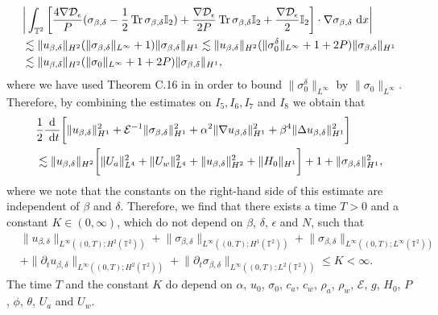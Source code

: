 \documentclass[12pt,a4paper]{article}
\theoremstyle{definition}
\theoremstyle{remark}
\numberwithin{equation}{section}
\newcommand{\dx}{\ {\rm d} {x}}
\newcommand{\dt}{\ {\rm d} t }
\DeclareMathOperator{\Tr}{Tr}
\begin{document}
\begin{align*}
&\bigg\lvert \int_{\mathbb{T}^2} \bigg[ \frac{4 \nabla \mathcal{D}_\epsilon}{P} (\sigma_{\beta,\delta} - \frac{1}{2} \Tr \sigma_{\beta,\delta} \mathbb I_2) + \frac{\nabla \mathcal{D}_\epsilon}{2 P} \Tr \sigma_{\beta,\delta} \mathbb I_2  + \frac{\nabla \mathcal{D}_\epsilon}{2} \mathbb I_2 \bigg] \cdot \nabla \sigma_{\beta,\delta} \dx \bigg\rvert \\
&\lesssim \lVert u_{\beta,\delta} \rVert_{H^2} (\lVert \sigma_{\beta,\delta} \rVert_{L^\infty} + 1) \lVert \sigma_{\beta,\delta} \rVert_{H^1} \lesssim \lVert u_{\beta,\delta} \rVert_{H^2} (\lVert \sigma_0^\delta \rVert_{L^\infty} + 1 + 2 P) \lVert \sigma_{\beta,\delta} \rVert_{H^1} \\
&\lesssim \lVert u_{\beta,\delta} \rVert_{H^2} (\lVert \sigma_0 \rVert_{L^\infty} + 1 + 2 P) \lVert \sigma_{\beta,\delta} \rVert_{H^1},
\end{align*}
where we have used Theorem C.16 in \cite{leoni} in order to bound $\lVert \sigma_0^\delta \rVert_{L^\infty}$ by $\lVert \sigma_0 \rVert_{L^\infty}$. Therefore, by combining the estimates on $I_5, I_6, I_7$ and $I_8$ we obtain that
\begin{align*}
&\frac{1}{2} \frac{\textrm{d}}{\dt} \bigg[ \lVert u_{\beta,\delta} \rVert_{H^1}^2 + \mathcal{E}^{-1} \lVert \sigma_{\beta,\delta} \rVert_{H^1}^2 + \alpha^2 \lVert \nabla u_{\beta,\delta} \rVert_{H^1}^2 + \beta^4 \lVert \Delta u_{\beta,\delta} \rVert_{H^1}^2 \bigg] \\
&\lesssim \lVert u_{\beta,\delta} \rVert_{H^2} \bigg[ \lVert U_a \rVert_{L^4}^2 + \lVert U_w \rVert_{L^4}^2 + \lVert u_{\beta,\delta} \rVert_{H^2}^2 + \lVert H_0 \rVert_{H^1} \bigg] + 1 + \lVert \sigma_{\beta,\delta} \rVert_{H^1}^2,
\end{align*}
where we note that the constants on the right-hand side of this estimate are independent of $\beta$ and $\delta$. Therefore, we find that there exists a time $T > 0$ and a constant $K \in (0,\infty)$, which do not depend on $\beta$, $\delta$, $\epsilon$ and $N$, such that
\begin{align*}
&\lVert u_{\beta,\delta} \rVert_{L^\infty ((0,T); H^2 (\mathbb{T}^2))} + \lVert \sigma_{\beta,\delta} \rVert_{L^\infty ((0,T); H^1 (\mathbb{T}^2))} + \lVert \sigma_{\beta,\delta} \rVert_{L^\infty ((0,T); L^\infty (\mathbb{T}^2))} \\
&+ \lVert \partial_t u_{\beta,\delta} \rVert_{L^\infty ((0,T); H^2 (\mathbb{T}^2))} + \lVert \partial_t \sigma_{\beta,\delta} \rVert_{L^\infty ((0,T); L^2 (\mathbb{T}^2))} \leq K < \infty.
\end{align*}
The time $T$ and the constant $K$ do depend on $\alpha$, $u_0$, $\sigma_0$, $c_a$, $c_w$, $\rho_a$, $\rho_w$, $\mathcal{E}$, $g$, $H_0$, $P$, $\phi$, $\theta$, $U_a$ and $U_w$.
\end{document}
